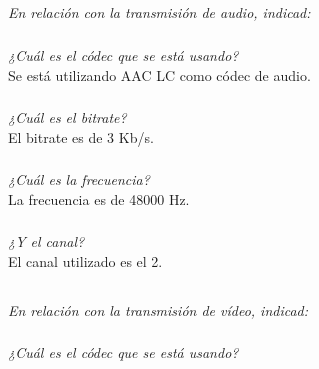 \documentclass[spanish]{article}
\begin{document}
\subsection{}

\textit{En relación con la transmisión de audio, indicad:}

\subsubsection{}

\textit{¿Cuál es el códec que se está usando?}\\

Se está utilizando AAC LC como códec de audio.

\subsubsection{}

\textit{¿Cuál es el bitrate?}\\

El bitrate es de 3 Kb/s.

\subsubsection{}

\textit{¿Cuál es la frecuencia?}\\

La frecuencia es de 48000 Hz.

\subsubsection{}

\textit{¿Y el canal?}\\

El canal utilizado es el 2.

\subsection{}

\textit{En relación con la transmisión de vídeo, indicad:}

\subsubsection{}

\textit{¿Cuál es el códec que se está usando?}\\
\end{document}
